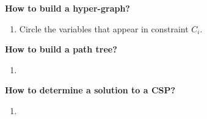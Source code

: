 \begin{example}
\end{example}
\newpage

\begin{process} \textbf{How to build a hyper-graph?}
    \begin{enumerate}
        \item Circle the variables that appear in constraint $C_i$.
    \end{enumerate}
\end{process}

\begin{example}
\end{example}

\begin{process} \textbf{How to build a path tree?}
    \begin{enumerate}
        \item 
    \end{enumerate}
\end{process}

\begin{example}
\end{example}

\begin{process} \textbf{How to determine a solution to a CSP?}
    \begin{enumerate}
        \item 
    \end{enumerate}
\end{process}

\begin{example}
\end{example}

